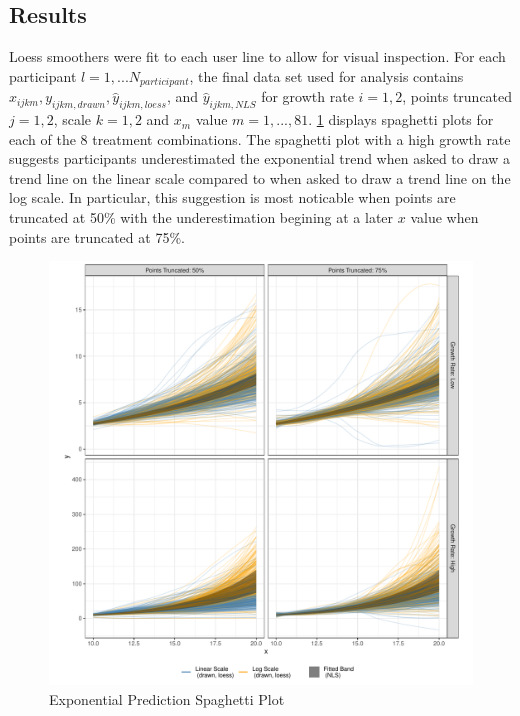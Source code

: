 \documentclass[print]{nuthesis}
\begin{document}
\hypertarget{results-2}{%
\subsection{Results}\label{results-2}}

Loess smoothers were fit to each user line to allow for visual inspection.
For each participant \(l = 1,...N_{participant}\), the final data set used for analysis contains \(x_{ijkm}, y_{ijkm,drawn}, \hat y_{ijkm,loess}\), and \(\hat y_{ijkm,NLS}\) for growth rate \(i = 1,2\), points truncated \(j = 1,2\), scale \(k = 1,2\) and \(x_{m}\) value \(m = 1, ...,81\).
\cref{fig:exponential-yloess-spaghetti-plot} displays spaghetti plots for each of the 8 treatment combinations.
The spaghetti plot with a high growth rate suggests participants underestimated the exponential trend when asked to draw a trend line on the linear scale compared to when asked to draw a trend line on the log scale.
In particular, this suggestion is most noticable when points are truncated at 50\% with the underestimation begining at a later \(x\) value when points are truncated at 75\%.

\begin{figure}[tbp]

{\centering \includegraphics[width=0.75\linewidth,]{thesis_files/figure-latex/exponential-yloess-spaghetti-plot-1} 

}

\caption{Exponential Prediction Spaghetti Plot}\label{fig:exponential-yloess-spaghetti-plot}
\end{figure}
\end{document}
